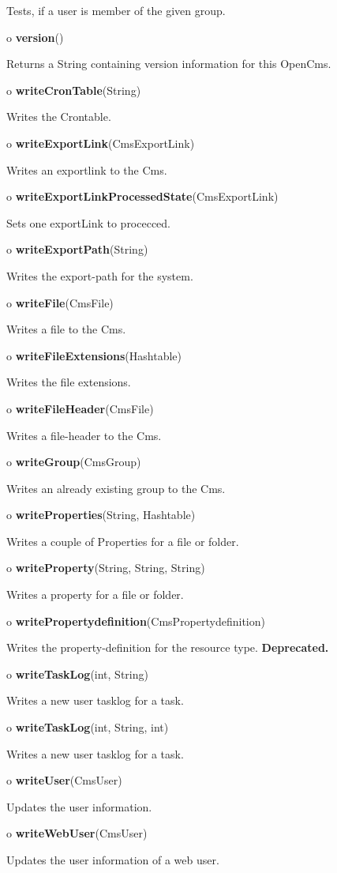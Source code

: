 \begin{description}
Tests, if a user is member of the given group.  
\item o {\bf version}()  

Returns a String containing version information for this OpenCms.  
\item o {\bf writeCronTable}(String)  

Writes the Crontable.  
\item o {\bf writeExportLink}(CmsExportLink)  

Writes an exportlink to the Cms.  
\item o {\bf writeExportLinkProcessedState}(CmsExportLink)  

Sets one exportLink to procecced.  
\item o {\bf writeExportPath}(String)  

Writes the export-path for the system.  
\item o {\bf writeFile}(CmsFile)  

Writes a file to the Cms.  
\item o {\bf writeFileExtensions}(Hashtable)  

Writes the file extensions.  
\item o {\bf writeFileHeader}(CmsFile)  

Writes a file-header to the Cms.  
\item o {\bf writeGroup}(CmsGroup)  

Writes an already existing group to the Cms.  
\item o {\bf writeProperties}(String, Hashtable)  

Writes a couple of Properties for a file or folder.  
\item o {\bf writeProperty}(String, String, String)  

Writes a property for a file or folder.  
\item o {\bf writePropertydefinition}(CmsPropertydefinition)  

Writes the property-definition for the resource type. {\bf Deprecated.}  
\item o {\bf writeTaskLog}(int, String)  

Writes a new user tasklog for a task.  
\item o {\bf writeTaskLog}(int, String, int)  

Writes a new user tasklog for a task.  
\item o {\bf writeUser}(CmsUser)  

Updates the user information.  
\item o {\bf writeWebUser}(CmsUser)  

Updates the user information of a web user. 
\end{description}

